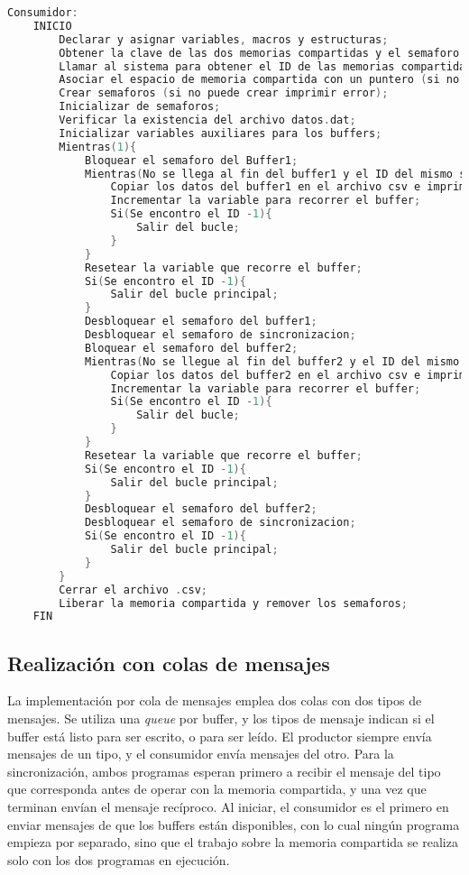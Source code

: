 \begin{lstlisting}[language=C]
    Consumidor:
    INICIO
        Declarar y asignar variables, macros y estructuras;
        Obtener la clave de las dos memorias compartidas y el semaforo (en el caso de no obtenerlas imprimir error);
        Llamar al sistema para obtener el ID de las memorias compartidas (en el caso de que no obtenerlas imprimir error);
        Asociar el espacio de memoria compartida con un puntero (si no puede asociar imprimir error);
        Crear semaforos (si no puede crear imprimir error);
        Inicializar de semaforos;
        Verificar la existencia del archivo datos.dat;
        Inicializar variables auxiliares para los buffers;
        Mientras(1){
	        Bloquear el semaforo del Buffer1;
	        Mientras(No se llega al fin del buffer1 y el ID del mismo sea distinto a -1){
		        Copiar los datos del buffer1 en el archivo csv e imprimirlos en pantalla;
		        Incrementar la variable para recorrer el buffer;
		        Si(Se encontro el ID -1){
			        Salir del bucle;
                }
	        }
	        Resetear la variable que recorre el buffer;
	        Si(Se encontro el ID -1){
	            Salir del bucle principal;
            }
            Desbloquear el semaforo del buffer1;
            Desbloquear el semaforo de sincronizacion;
            Bloquear el semaforo del buffer2;
		    Mientras(No se llegue al fin del buffer2 y el ID del mismo sea distinto a -1){
		        Copiar los datos del buffer2 en el archivo csv e imprimirlos en pantalla;
		        Incrementar la variable para recorrer el buffer;
		        Si(Se encontro el ID -1){
			        Salir del bucle;
                }
	        }
	        Resetear la variable que recorre el buffer;
	        Si(Se encontro el ID -1){
	            Salir del bucle principal;
            }
            Desbloquear el semaforo del buffer2;
            Desbloquear el semaforo de sincronizacion;
            Si(Se encontro el ID -1){
	            Salir del bucle principal;
            }
        }
        Cerrar el archivo .csv;
        Liberar la memoria compartida y remover los semaforos;
    FIN

\end{lstlisting}

\subsection{Realización con colas de mensajes}

La implementación por cola de mensajes emplea dos colas con dos tipos de mensajes. Se utiliza una \textit{queue} por buffer, y los tipos de mensaje indican si el buffer está listo para ser escrito, o para ser leído. El productor siempre envía mensajes de un tipo, y el consumidor envía mensajes del otro. Para la sincronización, ambos programas esperan primero a recibir el mensaje del tipo que corresponda antes de operar con la memoria compartida, y una vez que terminan envían el mensaje recíproco. Al iniciar, el consumidor es el primero en enviar mensajes de que los buffers están disponibles, con lo cual ningún programa empieza por separado, sino que el trabajo sobre la memoria compartida se realiza solo con los dos programas en ejecución.\\

